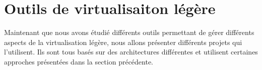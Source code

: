 \section{Outils de virtualisaiton légère}
\label{section:sota}

Maintenant que nous avons étudié différents outils permettant de gérer différents aspects de la virtualisation légère, nous allons présenter différents projets qui l'utilisent. Ils sont tous basés sur des architectures différentes et utilisent certaines approches présentées dans la section précédente.
